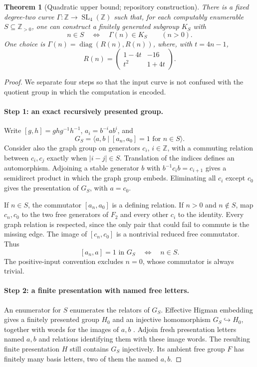 \documentclass[11pt,letterpaper]{article}
\newtheorem{theorem}{Theorem}[section]
\theoremstyle{definition}
\theoremstyle{remark}
\newcommand{\Z}{\mathbb Z}
\newcommand{\SL}{\operatorname{SL}}
\newcommand{\diag}{\operatorname{diag}}
\begin{document}
\begin{theorem}[Quadratic upper bound; repository construction]\label{gts:ai:thm:quadratic}
There is a fixed degree-two curve $\Gamma:\Z\to\SL_4(\Z)$ such that, for each computably enumerable $S\subseteq\Z_{>0}$, one can construct a finitely generated subgroup $K_S$ with
\[
 n\in S\quad\Longleftrightarrow\quad \Gamma(n)\in K_S
 \qquad(n>0).
\]
One choice is $\Gamma(n)=\diag(R(n),R(n))$, where, with $t=4n-1$,
\begin{equation}\label{gts:ai:eq:quadraticR}
 R(n)=\begin{pmatrix}1-4t&-16\\t^2&1+4t\end{pmatrix}.
\end{equation}
\end{theorem}
\begin{proof}
We separate four steps so that the input curve is not confused with the quotient group in which the computation is encoded.

\paragraph{Step 1: an exact recursively presented group.}
Write $[g,h]=ghg^{-1}h^{-1}$, $a_i=b^{-i}ab^i$, and
\[
 G_S=\langle a,b\mid[a_n,a_0]=1\text{ for }n\in S\rangle.
\]
Consider also the graph group on generators $c_i$, $i\in\Z$, with a commuting relation between $c_i,c_j$ exactly when $|i-j|\in S$. Translation of the indices defines an automorphism. Adjoining a stable generator $b$ with $b^{-1}c_i b=c_{i+1}$ gives a semidirect product in which the graph group embeds. Eliminating all $c_i$ except $c_0$ gives the presentation of $G_S$, with $a=c_0$.

If $n\in S$, the commutator $[a_n,a_0]$ is a defining relation. If $n>0$ and $n\notin S$, map $c_n,c_0$ to the two free generators of $F_2$ and every other $c_i$ to the identity. Every graph relation is respected, since the only pair that could fail to commute is the missing edge. The image of $[c_n,c_0]$ is a nontrivial reduced free commutator. Thus
\begin{equation}\label{gts:ai:eq:commutatorcoding}
 [a_n,a]=1\text{ in }G_S\quad\Longleftrightarrow\quad n\in S.
\end{equation}
The positive-input convention excludes $n=0$, whose commutator is always trivial.

\paragraph{Step 2: a finite presentation with named free letters.}
An enumerator for $S$ enumerates the relators of $G_S$. Effective Higman embedding gives a finitely presented group $H_0$ and an injective homomorphism $G_S\hookrightarrow H_0$, together with words for the images of $a,b$ \cite{ai-higman,ai-mikaelian}. Adjoin fresh presentation letters named $a,b$ and relations identifying them with these image words. The resulting finite presentation $H$ still contains $G_S$ injectively. Its ambient free group $F$ has finitely many basis letters, two of them the named $a,b$.


\end{proof}
\end{document}
